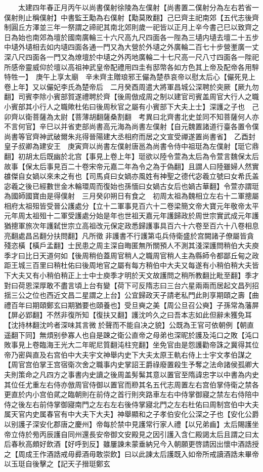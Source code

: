 　　太建四年春正月丙午以尚書僕射徐陵為左僕射【尚書置二僕射分為左右若省一僕射則止稱僕射】中書監王勱為右僕射【勱莫敗翻】己巳齊主祀南郊【五代志後齊制圓丘方澤並三年一祭謂之禘祀其南北郊則歲一祀皆以正月上辛今書己巳以致齊之日為始也南郊為壇於國南廣輪三十六尺高九尺四面各一陛為三壝内壝去壇二十五步中壝外壝相去如内壝四面各通一門又為大營於外壝之外廣輪二百七十步營壍廣一丈深八尺四面各一門又為燎壇於中壝之外丙地廣輪二十七尺高一尺八寸四面各一陛祀所感帝靈威仰於壇以高祖神武皇帝配禮用四圭有邸幣各如方色其上帝及配帝各用騂特牲一】　庚午上享太廟　辛未齊主贈琅邪王儼為楚恭哀帝以慰太后心【儼死見上卷上年】又以儼妃李氏為楚帝后　二月癸酉周遣大將軍昌城公深聘於突厥【厥九勿翻】司賓李除小賓部賀遂禮聘於齊【後周倣成周之制以建官司賓盖周官大行人之職小賓部其小行人之職歟杜佑曰後周秋官之屬有小賓部下大夫上士】深護之子也　己卯齊以衛菩薩為太尉【菩薄胡翻薩桑割翻　考異曰北齊書北史並同不知菩薩何人亦不言何官】辛巳以并省吏部尚書高元海為尚書左僕射【自元魏置諸道行臺各置令僕尚書等官齊神武破爾朱兆得晉陽建大丞相府而居之文宣受禪遂置尚書省】　乙酉封皇子叔卿為建安王　庚寅齊以尚書左僕射唐邕為尚書令侍中祖珽為左僕射【珽它鼎翻】初胡太后既幽於北宫【事見上卷上年】珽欲以陸令萱為太后為令萱言魏保太后故事【保太后事見百二十卷宋帝元嘉二年為令之為于偽翻】且謂人曰陸雖婦人然實䧺傑自女媧以來未之有也【司馬貞曰女媧亦風姓有神聖之德代宓羲立號曰女希氏盖宓羲之後已經數世金木輪環周而復始也孫愐曰女媧古女后也媧古華翻】令萱亦謂珽為國師國寶由是得僕射　三月癸卯朔日有食之　初周太祖為魏相立左右十二軍摠屬相府太祖殂皆受晉公護處分【立十二軍事見百六十二卷梁簡文帝大寶元年敬帝太平元年周太祖殂十二軍受護處分始是年也世祖天嘉元年護歸政於周世宗實武成元年護猶摠軍旅次年護弑世宗立高祖改元保定政悉歸護事具百六十六卷至百六十八卷相息亮翻處昌呂翻分扶問翻】凡所徵非護書不行護第屯兵侍衛盛於宫闕諸子僚屬皆貪殘恣橫【橫戶孟翻】士民患之周主深自晦匿無所關預人不測其淺深護問稍伯大夫庾季才曰比日天道何如【後周稍伯蓋周官稍人之職周官稍人主為縣師令都鄙丘甸之政距王城三百里曰稍杜佑曰後周地官之屬有每方稍伯中大夫又每遂有小稍伯稍大夫皆下大夫又有小稍伯稍正上士中士庾季才明於天文故護問之稍所教翻比毗至翻】季才對曰荷恩深厚敢不盡言頃上台有變【荷下可反隋志曰三台六星兩兩而居起文昌列招揺三公之位也西近文昌二星謂之上台】公宜歸政天子請老私門此則享期頤之壽【曲禮百年曰期頤鄭玄曰期猶要也頤養也】受旦奭之美【周公旦召公奭】子孫常為藩屏【屏必郢翻】不然非復所知【復扶又翻】護沈吟久之曰吾本志如此但辭未獲免耳【沈持林翻沈吟者深味其言微於聲而不能自决之貌】公既為王官可依朝例【朝直遥翻下同】無煩别參寡人也自是踈之衛公直帝之母弟也深昵於護及沌口之敗【沌口敗事見上卷臨海王光大二年昵尼質翻沌柱兖翻】坐免官由是怨護勸帝誅之冀得其位帝乃密與直及右宫伯中大夫宇文神舉内史下大夫太原王軌右侍上士宇文孝伯謀之【周官宫伯掌王宫宿衛次舍之職事内史掌詔王爵祿廢置殺生予奪之法命諸侯孤卿大夫則策命之凡四方之事書内史讀之後周盖髣髴其意以置官至隋諱忠字以中書為内史其位任尤重左右侍亦倣周官侍御以置官而剙其名五代志周置左右宫伯掌侍衛之禁各更直於内小宫伯貮之臨朝則在前侍之首行則夾路車左右中侍掌御寢之禁左右侍陪中侍之後左右前侍掌御寢南門之左右左右後侍掌寢北門之左右杜佑曰周制宫伯中大夫属天官内史属春官有中大夫下大夫】神舉顯和之子孝伯安化公深之子也【安化公爵以别護子深安化郡唐之慶州】帝每於禁中見護常行家人禮【以兄弟齒】太后賜護坐帝立侍於㫄丙辰護自同州還長安帝御文安殿見之因引護入含仁殿謁太后且謂之曰太后春秋高頗好飲酒【好呼到反】雖屢諫未蒙垂納兄今入朝願更啓請因出懷中酒誥授之【周成王作酒誥戒毋彛酒毋敢崇飲】曰以此諫太后護既入如帝所戒讀酒誥未畢帝以玉珽自後擊之【記天子搢珽鄭玄